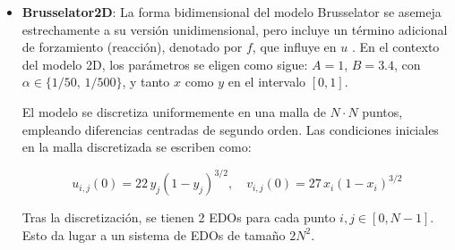 \begin{itemize}
	\begin{equation}
		\begin{split}
			\frac{\partial u}{\partial t} &= \alpha \nabla^2 u + A + u^2 v - (B + 1)u\\
			\frac{\partial v}{\partial t} &= \alpha \nabla^2 v + Bu - u^2 v
		\end{split}
	\end{equation}
	
	donde $A$ y $B$ son parámetros que controlan los términos de reacción y $\alpha$ representa la difusividad. Además, se aplican diferencias finitas centradas de segundo orden sobre una malla uniforme con $N$ puntos interiores, y se toman $A = 1$, $B = 3$ y $\alpha \in \{1/50,\, 1/500\}$, generando un sistema de $2N$ EDOs.
	
	\item \textbf{Brusselator2D}: La forma bidimensional del modelo Brusselator se asemeja estrechamente a su versión unidimensional, pero incluye un término adicional de forzamiento (reacción), denotado por $f$, que influye en $u$ \cite{Marabeh2024}. En el contexto del modelo 2D, los parámetros se eligen como sigue: $A = 1$, $B = 3.4$, con $\alpha \in \{1/50,\, 1/500\}$, y tanto $x$ como $y$ en el intervalo $[0,1]$. 
	
	El modelo se discretiza uniformemente en una malla de $N \cdot N$ puntos, empleando diferencias centradas de segundo orden. Las condiciones iniciales en la malla discretizada se escriben como:
	
	\begin{equation}
		u_{i,j}(0) = 22\,y_j(1-y_j)^{3/2}, \quad v_{i,j}(0) = 27\,x_i(1-x_i)^{3/2}
	\end{equation}
	
	Tras la discretización, se tienen 2 EDOs para cada punto $i,j \in [0, N-1]$. Esto da lugar a un sistema de EDOs de tamaño $2N^2$.
	
\end{itemize}

